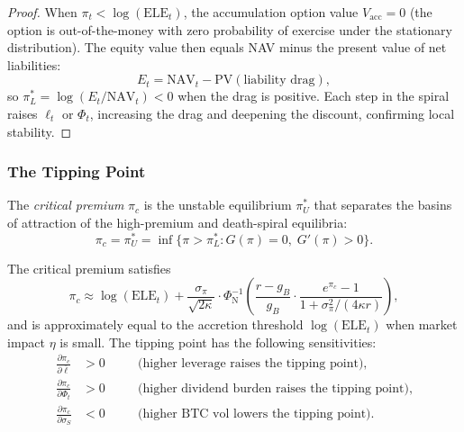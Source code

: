 \begin{proof}
When $\pi_t < \log(\mathrm{ELE}_t)$, the accumulation option value
$V_{\mathrm{acc}} = 0$ (the option is out-of-the-money with zero
probability of exercise under the stationary distribution).  The equity
value then equals NAV minus the present value of net liabilities:
\[
  E_t = \mathrm{NAV}_t - \mathrm{PV}(\text{liability drag}),
\]
so $\pi_L^* = \log(E_t / \mathrm{NAV}_t) < 0$ when the drag is positive.
Each step in the spiral raises $\ell_t$ or $\Phi_t$, increasing the drag
and deepening the discount, confirming local stability.
\end{proof}

\subsubsection{The Tipping Point}

\begin{definition}\label{def:critical_premium}
The \emph{critical premium} $\pi_c$ is the unstable equilibrium $\pi_U^*$
that separates the basins of attraction of the high-premium and death-spiral
equilibria:
\begin{equation}\label{eq:pi_critical}
  \pi_c = \pi_U^* = \inf\bigl\{\pi > \pi_L^* : G(\pi) = 0,\;
  G'(\pi) > 0 \bigr\}.
\end{equation}
\end{definition}

\begin{proposition}\label{prop:tipping}
The critical premium satisfies
\begin{equation}\label{eq:tipping_approx}
  \pi_c \approx \log(\mathrm{ELE}_t)
  + \frac{\sigma_\pi}{\sqrt{2\kappa}} \cdot
  \Phi_{\mathrm{N}}^{-1}\!\left(
    \frac{r - g_B}{g_B} \cdot \frac{e^{\pi_c} - 1}{1 + \sigma_\pi^2/(4\kappa r)}
  \right),
\end{equation}
and is approximately equal to the accretion threshold
$\log(\mathrm{ELE}_t)$ when market impact $\eta$ is small.
The tipping point has the following sensitivities:
\begin{align}
  \frac{\partial \pi_c}{\partial \bar\ell} &> 0
    &\quad& \text{(higher leverage raises the tipping point)},
    \label{eq:tip_ell} \\
  \frac{\partial \pi_c}{\partial \Phi_t} &> 0
    &\quad& \text{(higher dividend burden raises the tipping point)},
    \label{eq:tip_phi} \\
  \frac{\partial \pi_c}{\partial \sigma_S} &< 0
    &\quad& \text{(higher BTC vol lowers the tipping point)}.
    \label{eq:tip_sigma}
\end{align}
\end{proposition}

